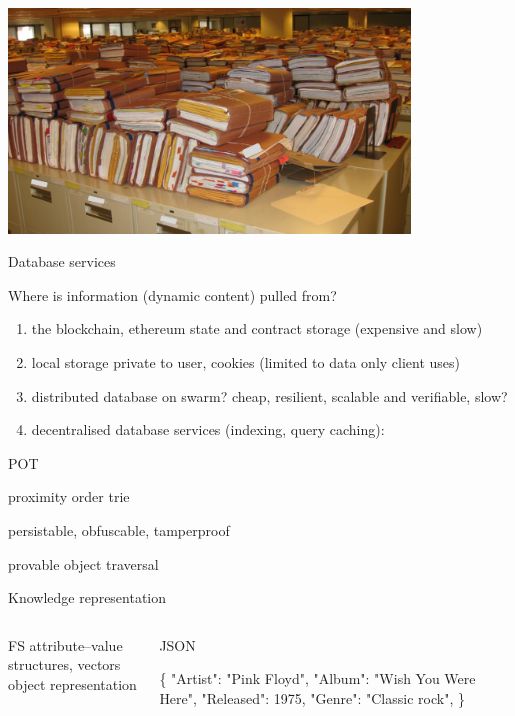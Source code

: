 

\begin{frame}[plain,c]
  \includegraphics[width=0.8\textwidth]{basementfiles.jpg}
\end{frame}

\begin{frame}{Database services}
\begin{block}{Where is information (dynamic content) pulled from?}
\begin{enumerate}
\item the blockchain, ethereum state and contract storage (expensive and slow)
\item local storage private to user, cookies (limited to data only client uses)
\item distributed database on swarm? cheap, resilient, scalable and verifiable, slow?
\item decentralised database services (indexing, query caching):
\end{enumerate}
\end{block}
\end{frame}

\begin{frame}{POT}
\begin{block}{}
proximity order trie
\end{block}
\begin{block}{}
persistable, obfuscable, tamperproof
\end{block}
\begin{block}{}
provable object traversal
\end{block}
\end{frame}


\begin{frame}{Knowledge representation}
\begin{columns}[t]
  \begin{block}{FS}
  attribute--value structures, vectors\\
  object representation
  \end{block}
    \begin{block}{JSON}
    \begin{semiverbatim}
\{
"Artist": "Pink Floyd",
"Album": "Wish You Were Here",
"Released": 1975,
"Genre": "Classic rock",
\}
    \end{semiverbatim}
    \end{block}

\end{columns}
\end{frame}

